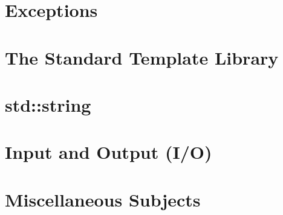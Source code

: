 \documentclass[UTF8]{ctexart}
\begin{document}
\newpage

\section{Exceptions}











\newpage

\section{The Standard Template Library}






\newpage

\section{std::string}









\newpage

\section{Input and Output (I/O)}

\newpage

\section{Miscellaneous Subjects}
\end{document}
